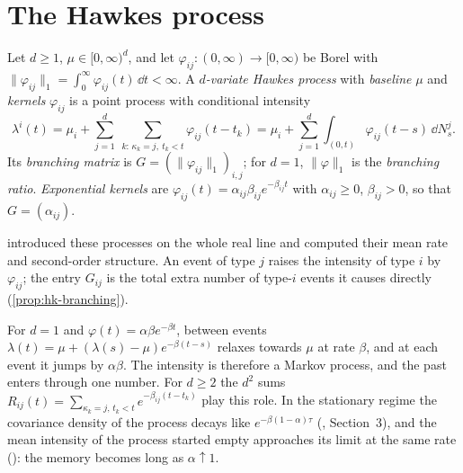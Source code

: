 \section{The Hawkes process}\label{sec:hk-hawkes}

\begin{definition}\label{def:hk-hawkes}
Let $d\ge1$, $\mu\in[0,\infty)^d$, and let $\varphi_{ij}:(0,\infty)\to[0,\infty)$ be Borel with
$\|\varphi_{ij}\|_1=\int_0^\infty\varphi_{ij}(t)\,\dd t<\infty$. A \emph{$d$-variate Hawkes process} with
\emph{baseline} $\mu$ and \emph{kernels} $\varphi_{ij}$ is a point process with conditional intensity
\begin{equation}\label{eq:hk-hawkes}
  \lambda^i(t)=\mu_i+\sum_{j=1}^d\ \sum_{k:\,\kappa_k=j,\ t_k<t}\varphi_{ij}(t-t_k)
  =\mu_i+\sum_{j=1}^d\int_{(0,t)}\varphi_{ij}(t-s)\,\dd N^j_s .
\end{equation}
Its \emph{branching matrix} is $G=(\|\varphi_{ij}\|_1)_{i,j}$; for $d=1$, $\|\varphi\|_1$ is the \emph{branching
ratio}. \emph{Exponential kernels} are $\varphi_{ij}(t)=\alpha_{ij}\beta_{ij}e^{-\beta_{ij}t}$ with
$\alpha_{ij}\ge0$, $\beta_{ij}>0$, so that $G=(\alpha_{ij})$.
\end{definition}

\textcite{hawkes-1971} introduced these processes on the whole real line and computed their mean rate and
second-order structure. An event of type $j$ raises the intensity of type $i$ by $\varphi_{ij}$; the entry
$G_{ij}$ is the total extra number of type-$i$ events it causes directly (\cref{prop:hk-branching}).

\begin{remark}\label{rem:hk-exp}
For $d=1$ and $\varphi(t)=\alpha\beta e^{-\beta t}$, between events $\lambda(t)=\mu+(\lambda(s)-\mu)e^{-\beta(t-s)}$
relaxes towards $\mu$ at rate $\beta$, and at each event it jumps by $\alpha\beta$. The intensity is therefore a
Markov process, and the past enters through one number. For $d\ge2$ the $d^2$ sums
$R_{ij}(t)=\sum_{\kappa_k=j,\,t_k<t}e^{-\beta_{ij}(t-t_k)}$ play this role. In the stationary regime the
covariance density of the process decays like $e^{-\beta(1-\alpha)\tau}$ (\textcite{hawkes-1971}, Section~3), and
the mean intensity of the process started empty approaches its limit at the same rate
(): the memory becomes long as $\alpha\uparrow1$.
\end{remark}

